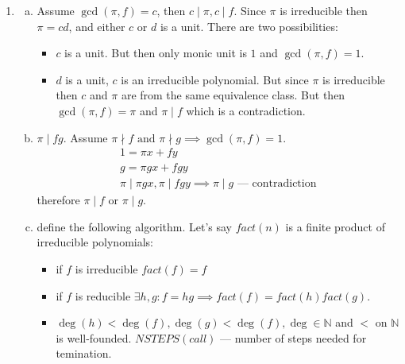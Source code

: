 \documentclass[12pt]{article}
\begin{document}
\begin{enumerate}
        Now let's consider an arbitrary $c$, such that $c | f, c | g$.
        \[
        \begin{gathered}
          c \mid f, c \mid g \implies c \mid r_0 \\
          c \mid g, c \mid r_0 \implies c \mid r_1 \\
          \cdots \\
          c \mid r_{k}, c \mid r_{k+1} \implies c \mid r_{k+2}
        \end{gathered}
        \]

        Since $\exists k \colon d = r_k$ then $c \mid d$ for arbitrary $c$. Therefore since $d \mid f, d \mid g, d = \gcd(f, g)$.

        Now since $d$ must be monic let's consider $d(t)=d_0 + d_1t + \cdots + d_{n}t^n$. Since $d_{n}\in F, F \text{ --- field} \implies \exists d_{n}^{-1} \implies d'=d_{n}^{-1}d \text{ is monic}$.
  \item
        \begin{enumerate}[a)]
          \item Assume $\gcd(\pi, f)=c$, then $c \mid \pi, c \mid f$. Since $\pi$ is irreducible then $\pi=cd$, and either $c$ or $d$ is a unit. There are two possibilities:
                \begin{itemize}
                  \item $c$ is a unit. But then only monic unit is $1$ and $\gcd(\pi, f)=1$.
                  \item $d$ is a unit, $c$ is an irreducible polynomial. But since $\pi$ is irreducible then $c$ and $\pi$ are from the same equivalence class. But then $\gcd(\pi, f) = \pi$ and $\pi \mid f$ which is a contradiction.
                \end{itemize}
          \item $\pi \mid fg$. Assume $\pi \nmid f \text{ and } \pi \nmid g \implies \gcd(\pi, f) = 1$.
                \[
                \begin{gathered}
                  1 = {\pi}x + fy \\
                  g = {\pi}gx + fgy \\
                  \pi \mid {\pi}gx, \pi \mid fgy \implies \pi \mid g \text{ --- contradiction}
                \end{gathered}
                \]
                therefore $\pi \mid f \text{ or } \pi \mid g$.
          \item define the following algorithm. Let's say $fact(n)$ is a finite product of irreducible polynomials:
                \begin{itemize}
                  \item if $f$ is irreducible $fact(f) = f$
                  \item if $f$ is reducible $\exists h,g \colon f=hg \implies fact(f)=fact(h)fact(g)$.
                  \item $\deg(h) < \deg(f), \deg(g) < \deg(f), \deg \in \mathbb{N}$ and $<$ on $\mathbb{N}$ is well-founded. $NSTEPS(call)$ --- number of steps needed for temination.



\end{itemize}
\end{enumerate}
\end{enumerate}
\end{document}
